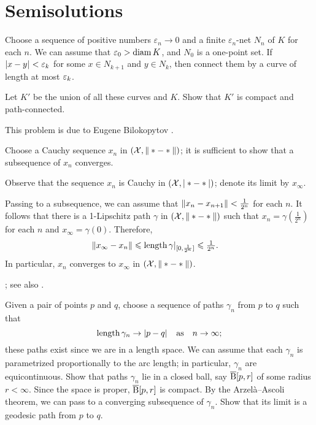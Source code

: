 
\chapter{Semisolutions}

Choose a sequence of positive numbers $\varepsilon_n\to 0$ and a finite $\varepsilon_n$-net $N_n$ of $K$ for each $n$.
We can assume that $\varepsilon_0>\operatorname{\rm diam}\nolimits K$, and $N_0$ is a one-point set.
If $|{x}-{y}|_{}^{{}}<\varepsilon_k$ for some $x\in N_{k+1}$ and $y\in N_{k}$, then connect them by a curve of length at most $\varepsilon_k$.

Let $K'$ be the union of all these curves and $K$.
Show that $K'$ is compact and path-connected.

 This problem is due to Eugene Bilokopytov \cite{bilokopytov}.

Choose a Cauchy sequence $x_n$ in $(\mathcal{X},\|*-*\|)$; it is sufficient to show that a subsequence of $x_n$ converges.

Observe that the sequence $x_n$ is Cauchy in $(\mathcal{X},|*-*|)$;
denote its limit by $x_\infty$.

Passing to a subsequence, we can assume that $\|x_n-x_{n+1}\|<\tfrac1{2^n}$ for each $n$.
It follows that there is a 1-Lipschitz path $\gamma$ in $(\mathcal{X},\|*-*\|)$ such that $x_n=\gamma(\tfrac1{2^n})$ for each $n$ and $x_\infty=\gamma(0)$.
Therefore,
\begin{align*}
\|x_\infty-x_n\|&\leqslant \mathop{\rm length}\nolimits\gamma|_{[0,\frac1{2^n}]}\leqslant \tfrac1{2^n}.
\end{align*}
In particular, $x_n$ converges to $x_\infty$ in $(\mathcal{X},\|*-*\|)$.

 \cite[Corollary]{hu-kirk}; see also \cite[Lemma 2.3]{petrunin-stadler}.

Given a pair of points $p$ and $q$, choose a sequence of paths $\gamma_n$ from $p$ to $q$ such that
\[\mathop{\rm length}\nolimits\gamma_n\to |{p}-{q}|_{}^{{}}
\quad\text{as}\quad
n\to\infty;\]
these paths exist since we are in a length space.
We can assume that each $\gamma_n$ is parametrized proportionally to the arc length;
in particular, $\gamma_n$ are equicontinuous.
Show that paths $\gamma_n$ lie in a closed ball, say $\overline{\mathrm{B}}{}[p,r]$ of some radius $r<\infty$.
Since the space is proper, $\overline{\mathrm{B}}{}[p,r]$ is compact.
By the Arzelà--Ascoli theorem, we can pass to a converging subsequence of $\gamma_n$.
Show that its limit is a geodesic path from $p$ to $q$.

